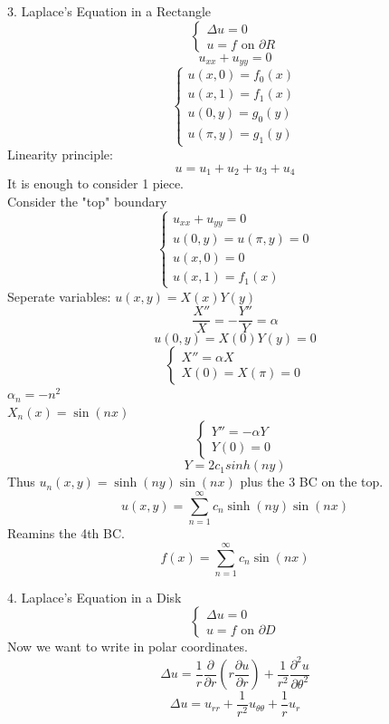 \documentclass{article}
\begin{document}
3. Laplace's Equation in a Rectangle \\
$$\begin{cases}
    \Delta u = 0\\
    u = f \text{ on } \partial R
\end{cases}$$
$$ u_{xx} + u_{yy} = 0$$
$$\begin{cases}
    u(x,0) = f_0(x)\\
    u(x,1) = f_1(x)\\
    u(0,y) = g_0(y)\\
    u(\pi, y) = g_1(y)
\end{cases}$$
Linearity principle: \\
$$u = u_1 + u_2 + u_3 + u_4$$
It is enough to consider 1 piece.\\
Consider the "top" boundary
$$\begin{cases}
    u_{xx} + u_{yy} = 0\\
    u(0,y) = u(\pi,y) = 0\\
    u(x,0) = 0\\
    u(x,1) = f_1(x)
\end{cases}$$
Seperate variables: $u(x,y) = X(x)Y(y)$\\
$$\frac{X''}{X} = -\frac{Y''}{Y} = \alpha$$
$$ u(0,y) = X(0)Y(y) = 0$$
$$ \begin{cases}
    X'' = \alpha X\\
    X(0) = X(\pi) = 0
\end{cases}$$
$\alpha_n = -n^2$\\
$X_n(x) = \sin(nx)$\\
$$\begin{cases}
    Y'' = -\alpha Y\\
    Y(0) = 0
\end{cases}$$ 
$$Y = 2c_1 sinh(ny)$$ 
Thus $u_n(x,y) = \sinh(ny) \sin(nx)$ plus the 3 BC on the top.\\
$$u(x,y) = \sum_{n=1}^{\infty} c_n \sinh(ny) \sin(nx)$$
Reamins the 4th BC.\\
$$f(x) = \sum_{n=1}^{\infty} c_n \sin(nx)$$

4. Laplace's Equation in a Disk \\
$$\begin{cases}
    \Delta u = 0\\
    u = f \text{ on } \partial D
\end{cases}$$
Now we want to write in polar coordinates.\\
$$\Delta u = \frac{1}{r} \frac{\partial}{\partial r} \left( r \frac{\partial u}{\partial r} \right) + \frac{1}{r^2} \frac{\partial^2 u}{\partial \theta^2}$$
$$ \Delta u = u_{rr} + \frac{1}{r^2} u_{\theta \theta} + \frac{1}{r} u_r$$
\end{document}

